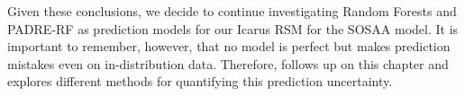 \noindent Given these conclusions, we decide to continue investigating Random Forests and PADRE-RF as prediction models for our Icarus RSM for the SOSAA model. It is important to remember, however, that no model is perfect but makes prediction mistakes even on in-distribution data. Therefore,  follows up on this chapter and explores different methods for quantifying this prediction uncertainty.
